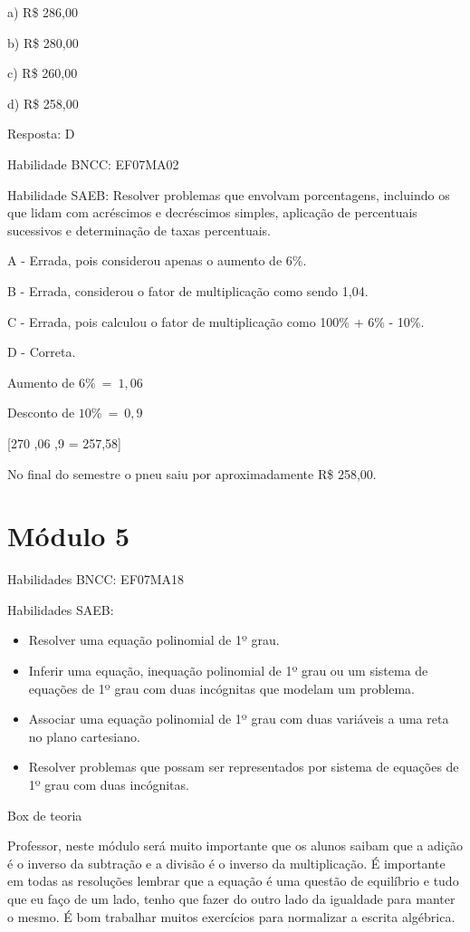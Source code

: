 a) R\$ 286,00

b) R\$ 280,00

c) R\$ 260,00

d) R\$ 258,00

Resposta: D

Habilidade BNCC: EF07MA02

Habilidade SAEB: Resolver problemas que envolvam porcentagens, incluindo
os que lidam com acréscimos e decréscimos simples, aplicação de
percentuais sucessivos e determinação de taxas percentuais.

A - Errada, pois considerou apenas o aumento de 6\%.

B - Errada, considerou o fator de multiplicação como sendo 1,04.

C - Errada, pois calculou o fator de multiplicação como 100\% + 6\% -
10\%.

D - Correta.

Aumento de \(6\%\  = \ 1,06\)

Desconto de \(10\%\  = \ 0,9\)

[270 ,06 ,9 = 257,58]

No final do semestre o pneu saiu por aproximadamente R\$ 258,00.

\section{Módulo 5}

Habilidades BNCC: EF07MA18

Habilidades SAEB:

\begin{itemize}
\item
  Resolver uma equação polinomial de 1º grau.
\item
  Inferir uma equação, inequação polinomial de 1º grau ou um sistema de
  equações de 1º grau com duas incógnitas que modelam um problema.
\item
  Associar uma equação polinomial de 1º grau com duas variáveis a uma
  reta no plano cartesiano.
\item
  Resolver problemas que possam ser representados por sistema de
  equações de 1º grau com duas incógnitas.
\end{itemize}

Box de teoria

Professor, neste módulo será muito importante que os alunos saibam que a
adição é o inverso da subtração e a divisão é o inverso da
multiplicação. É importante em todas as resoluções lembrar que a equação
é uma questão de equilíbrio e tudo que eu faço de um lado, tenho que
fazer do outro lado da igualdade para manter o mesmo. É bom trabalhar
muitos exercícios para normalizar a escrita algébrica.

